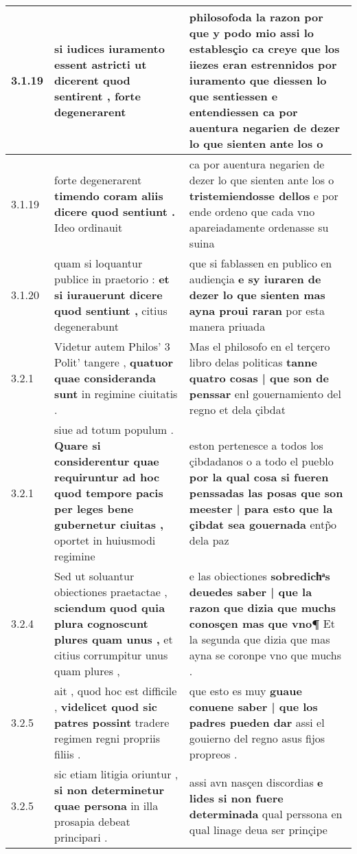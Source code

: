 \begin{tabular}{|p{1cm}|p{6.5cm}|p{6.5cm}|}
3.1.19 & si iudices iuramento essent astricti \textbf{ ut dicerent quod sentirent , } forte degenerarent & philosofoda la razon por que y podo mio assi lo establesçio ca creye que los iiezes eran estrennidos por iuramento \textbf{ que diessen lo que sentiessen e entendiessen } ca por auentura negarien de dezer lo que sienten ante los o \\\hline
3.1.19 & forte degenerarent \textbf{ timendo coram aliis dicere quod sentiunt . } Ideo ordinauit & ca por auentura negarien de dezer lo que sienten ante los o \textbf{ tristemiendosse dellos } e por ende ordeno que cada vno apareiadamente ordenasse su suina \\\hline
3.1.20 & quam si loquantur publice in praetorio : \textbf{ et si iurauerunt dicere quod sentiunt , } citius degenerabunt & que si fablassen en publico en audiençia \textbf{ e sy iuraren de dezer lo que sienten mas ayna proui raran } por esta manera priuada \\\hline
3.2.1 & Videtur autem Philos’ 3 Polit’ tangere , \textbf{ quatuor quae consideranda sunt } in regimine ciuitatis . & Mas el philosofo en el terçero libro delas politicas \textbf{ tanne quatro cosas | que son de penssar } enł gouernamiento del regno et dela çibdat \\\hline
3.2.1 & siue ad totum populum . \textbf{ Quare si considerentur quae requiruntur ad hoc quod tempore pacis per leges bene gubernetur ciuitas , } oportet in huiusmodi regimine & eston pertenesce a todos los çibdadanos o a todo el pueblo \textbf{ por la qual cosa si fueren penssadas las posas que son meester | para esto que la çibdat sea gouernada } entp̃o dela paz \\\hline
3.2.4 & Sed ut soluantur obiectiones praetactae , \textbf{ sciendum quod quia plura cognoscunt plures quam unus , } et citius corrumpitur unus quam plures , & e las obiectiones \textbf{ sobredichͣs deuedes saber | que la razon que dizia que muchs conosçen mas que vno¶ } Et la segunda que dizia que mas ayna se coronpe vno que muchs . \\\hline
3.2.5 & ait , quod hoc est difficile , \textbf{ videlicet quod sic patres possint } tradere regimen regni propriis filiis . & que esto es muy \textbf{ guaue conuene saber | que los padres pueden dar } assi el gouierno del regno asus fijos propreos . \\\hline
3.2.5 & sic etiam litigia oriuntur , \textbf{ si non determinetur quae persona } in illa prosapia debeat principari . & assi avn nasçen discordias \textbf{ e lides si non fuere determinada } qual perssona en qual linage deua ser prinçipe \\\hline

\end{tabular}
